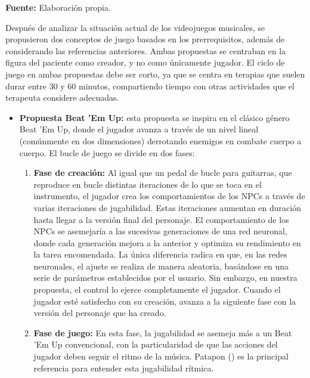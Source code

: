\begin{center}
	\textbf{Fuente:} Elaboración propia.
\end{center}

Después de analizar la situación actual de los videojuegos musicales, se propusieron dos conceptos de juego basados en los prerrequisitos, además de considerando las referencias anteriores. Ambas propuestas se centraban en la figura del paciente como creador, y no como únicamente jugador. El ciclo de juego en ambas propuestas debe ser corto, ya que se centra en terapias que suelen durar entre 30 y 60 minutos, compartiendo tiempo con otras actividades que el terapeuta considere adecuadas.

\begin{itemize}
	\item \textbf{Propuesta Beat 'Em Up:} esta propuesta se inspira en el clásico género Beat 'Em Up, donde el jugador avanza a través de un nivel lineal (comúnmente en dos dimensiones) derrotando enemigos en combate cuerpo a cuerpo. El bucle de juego se divide en dos fases:
	\begin{enumerate}
		\item \textbf{Fase de creación:} Al igual que un pedal de bucle para guitarras, que reproduce en bucle distintas iteraciones de lo que se toca en el instrumento, el jugador crea los comportamientos de los NPCs a través de varias iteraciones de jugabilidad. Estas iteraciones aumentan en duración hasta llegar a la versión final del personaje. El comportamiento de los NPCs se asemejaría a las sucesivas generaciones de una red neuronal, donde cada generación mejora a la anterior y optimiza su rendimiento en la tarea encomendada. La única diferencia radica en que, en las redes neuronales, el ajuste se realiza de manera aleatoria, basándose en una serie de parámetros establecidos por el usuario. Sin embargo, en nuestra propuesta, el control lo ejerce completamente el jugador. Cuando el jugador esté satisfecho con su creación, avanza a la siguiente fase con la versión del personaje que ha creado.
		
		\item \textbf{Fase de juego:} En esta fase, la jugabilidad se asemeja más a un Beat 'Em Up convencional, con la particularidad de que las acciones del jugador deben seguir el ritmo de la música. Patapon (\cite{PATAPON:2007}) es la principal referencia para entender esta jugabilidad rítmica.
	\end{enumerate}
	

\end{itemize}
